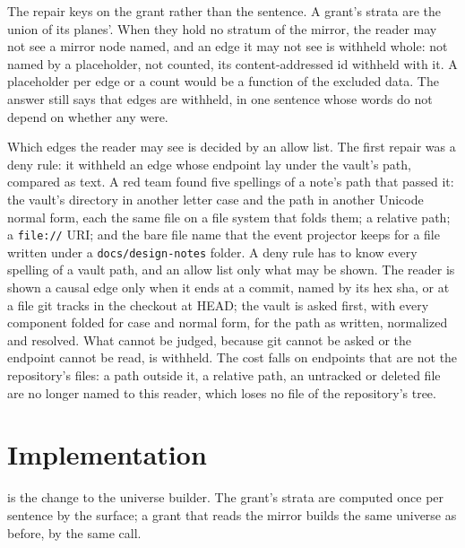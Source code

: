 \documentclass[11pt]{article}
\theoremstyle{plain}
\theoremstyle{definition}
\theoremstyle{remark}
\begin{document}
The repair keys on the grant rather than the sentence. A grant's strata are the union of its
planes'. When they hold no stratum of the mirror, the reader may not see a mirror node named, and
an edge it may not see is withheld whole: not named by a placeholder, not counted, its
content-addressed id withheld with it. A placeholder per edge or a count would be a function of the
excluded data. The answer still says that edges are withheld, in one sentence whose words do not
depend on whether any were.

Which edges the reader may see is decided by an allow list. The first repair was a deny rule: it
withheld an edge whose endpoint lay under the vault's path, compared as text. A red team found
five spellings of a note's path that passed it: the vault's directory in another letter case and
the path in another Unicode normal form, each the same file on a file system that folds them; a
relative path; a \texttt{file://} URI; and the bare file name that the event projector keeps for a
file written under a \texttt{docs/design-notes} folder. A deny rule has to know every spelling of
a vault path, and an allow list only what may be shown. The reader is shown a causal edge only
when it ends at a commit, named by its hex sha, or at a file git tracks in the checkout at HEAD;
the vault is asked first, with every component folded for case and normal form, for the path as
written, normalized and resolved. What cannot be judged, because git cannot be asked or the
endpoint cannot be read, is withheld. The cost falls on endpoints that are not the repository's
files: a path outside it, a relative path, an untracked or deleted file are no longer named to
this reader, which loses no file of the repository's tree.

\section{Implementation}

 is the change to the universe builder. The grant's strata are computed once per
sentence by the surface; a grant that reads the mirror builds the same universe as before, by the
same call.
\end{document}

